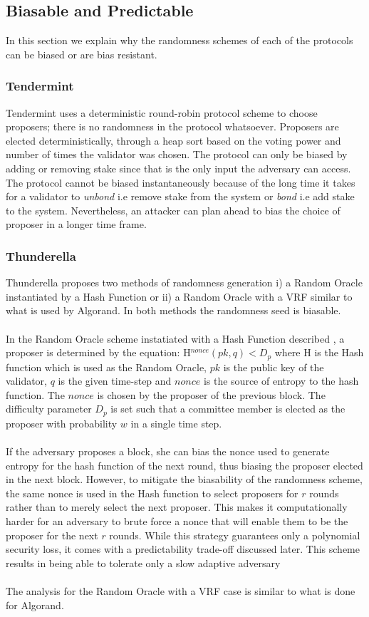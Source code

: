 \documentclass[10pt,journal,compsoc]{IEEEtran}
\begin{document}
\subsection{Biasable and Predictable}
In this section we explain why the randomness schemes of each of the protocols can be biased or are bias resistant. 
\subsubsection{Tendermint}
Tendermint uses a deterministic round-robin protocol scheme to choose proposers; there is no randomness in the protocol whatsoever. Proposers are elected deterministically, through a heap sort based on the voting power and number of times the validator was chosen. The protocol can only be biased by adding or removing stake since that is the only input the adversary can access. The protocol cannot be biased instantaneously because of the long time it takes for a validator to \emph{unbond} i.e remove stake from the system or \emph{bond} i.e add stake to the system. Nevertheless, an attacker can plan ahead to bias the choice of proposer in a longer time frame.

\subsubsection{Thunderella}
Thunderella proposes two methods of randomness generation i) a Random Oracle instantiated by a Hash Function or ii) a Random Oracle with a VRF similar to what is used by Algorand. In both methods the randomness seed is biasable.
\\\\
In the Random Oracle scheme instatiated with a Hash Function described \cite{SnowWhite}, a proposer is determined by the equation: H$^{nonce}(pk, q) < D_p$ where H is the Hash function which is used as the Random Oracle, $pk$ is the public key of the validator, $q$ is the given time-step and $nonce$ is the source of entropy to the hash function. The $nonce$ is chosen by the proposer of the previous block. The difficulty parameter $D_p$ is set such that a committee member is elected as the proposer with probability $w$ in a single time step. 
\\\\
If the adversary proposes a block, she can bias the nonce used to generate entropy for the hash function of the next round, thus biasing the proposer elected in the next block. However, to mitigate the biasability of the randomness scheme, the same nonce is used in the Hash function to select proposers for $r$ rounds rather than to merely select the next proposer. This makes it computationally harder for an adversary to brute force a nonce that will enable them to be the proposer for the next $r$ rounds. While this strategy guarantees only a polynomial security loss, it comes with a predictability trade-off discussed later. This scheme results in being able to tolerate only a slow adaptive adversary
\\\\
The analysis for the Random Oracle with a VRF case is similar to what is done for Algorand. 
\end{document}
